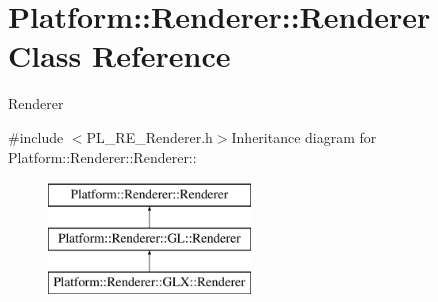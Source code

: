 \hypertarget{classPlatform_1_1Renderer_1_1Renderer}{
\section{Platform::Renderer::Renderer Class Reference}
\label{classPlatform_1_1Renderer_1_1Renderer}
}


Renderer  


{\ttfamily \#include $<$PL\_\-RE\_\-Renderer.h$>$}Inheritance diagram for Platform::Renderer::Renderer::\begin{figure}[H]
\begin{center}
\leavevmode
\includegraphics[height=3cm]{classPlatform_1_1Renderer_1_1Renderer}
\end{center}
\end{figure}
